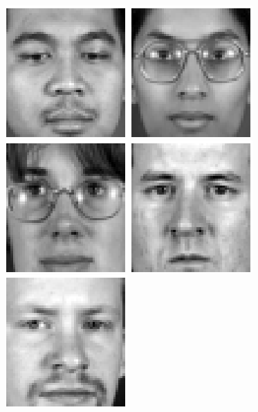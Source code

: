 \begin{figure}
\begin{center}
\includegraphics[scale=0.12]{ch4/figures/XM2VTS_26.png}
\includegraphics[scale=0.12]{ch4/figures/XM2VTS_27.png}
\includegraphics[scale=0.12]{ch4/figures/XM2VTS_28.png}
\includegraphics[scale=0.12]{ch4/figures/XM2VTS_29.png}
\includegraphics[scale=0.12]{ch4/figures/XM2VTS_30.png}

\end{center}
\end{figure}
